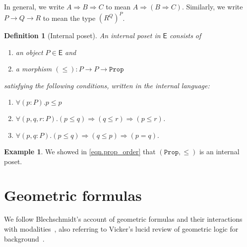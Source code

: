 \documentclass[reqno,11pt]{amsproc}
\theoremstyle{plain}
\newtheorem{definition}[theorem]{Definition}
\theoremstyle{definition}
\newtheorem{example}[theorem]{Example}
\newcommand{\Const}[1]{\mathtt{#1}}
\newcommand{\cat}[1]{\mathsf{#1}}
\renewcommand{\to}[1][]{\xrightarrow{#1}}
\newcommand{\prop}{\Const{Prop}}
\newcommand{\imp}{\Rightarrow}
\numberwithin{equation}{section}
\begin{document}
In general, we write $A\imp B\imp C$ to mean $A\imp(B\imp C)$. Similarly, we write $P\to Q\to R$ to mean the type $(R^Q)^P$.

\begin{definition}[Internal poset]\label{def.internal_poset}
An \emph{internal poset} in $\cat{E}$ consists of
\begin{enumerate}
	\item an object $P\in\cat{E}$ and
	\item a morphism $(\le)\colon P\to P\to\prop$
\end{enumerate}
satisfying the following conditions, written in the internal language:
\begin{enumerate}[label=\alph*.]
	\item $\forall (p:P).p\le p$
	\item $\forall (p,q,r:P).(p\le q)\imp (q\le r)\imp(p\le r)$.
	\item $\forall (p,q:P).(p\le q)\imp(q\le p)\imp (p=q).$
\end{enumerate}
\end{definition}

\begin{example}
We showed in \cref{eqn.prop_order} that $(\prop,\le)$ is an internal poset.
\end{example}






\section{Geometric formulas}

We follow Blechschmidt's account of geometric formulas and their interactions with modalities~\cite[Chapter~2~and~6]{blechschmidt2017internal}, also referring to Vicker's lucid review of geometric logic for background~\cite{vickers_geometric_logic}.

\clearpage



\end{document}
